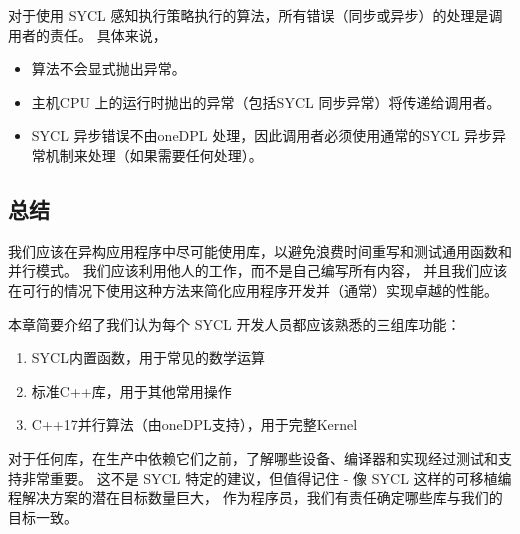 对于使用 SYCL 感知执行策略执行的算法，所有错误（同步或异步）的处理是调用者的责任。 具体来说，

\begin{itemize}
	\item 算法不会显式抛出异常。

	\item 主机CPU 上的运行时抛出的异常（包括SYCL 同步异常）将传递给调用者。

	\item SYCL 异步错误不由oneDPL 处理，因此调用者必须使用通常的SYCL 异步异常机制来处理（如果需要任何处理）。
\end{itemize}

\subsection{总结}
我们应该在异构应用程序中尽可能使用库，以避免浪费时间重写和测试通用函数和并行模式。 
我们应该利用他人的工作，而不是自己编写所有内容，
并且我们应该在可行的情况下使用这种方法来简化应用程序开发并（通常）实现卓越的性能。

本章简要介绍了我们认为每个 SYCL 开发人员都应该熟悉的三组库功能：

\begin{enumerate}
	\item SYCL内置函数，用于常见的数学运算

	\item 标准C++库，用于其他常用操作

	\item C++17并行算法（由oneDPL支持），用于完整Kernel
\end{enumerate}

对于任何库，在生产中依赖它们之前，了解哪些设备、编译器和实现经过测试和支持非常重要。 
这不是 SYCL 特定的建议，但值得记住 - 像 SYCL 这样的可移植编程解决方案的潜在目标数量巨大，
作为程序员，我们有责任确定哪些库与我们的目标一致。